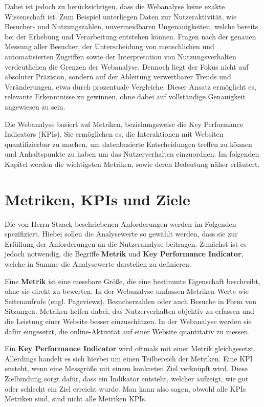 Dabei ist jedoch zu berücksichtigen, dass die Webanalyse keine exakte Wissenschaft ist. Zum Beispiel unterliegen Daten zur Nutzeraktivität, wie Besucher- und Nutzungszahlen, unvermeidbaren Ungenauigkeiten, welche bereits bei der Erhebung und Verarbeitung entstehen können. Fragen nach der genauen Messung aller Besucher, der Unterscheidung von menschlichen und automatisierten Zugriffen sowie der Interpretation von Nutzungsverhalten verdeutlichen die Grenzen der Webanalyse. Dennoch liegt der Fokus nicht auf absoluter Präzision, sondern auf der Ableitung verwertbarer Trends und Veränderungen, etwa durch prozentuale Vergleiche. Dieser Ansatz ermöglicht es, relevante Erkenntnisse zu gewinnen, ohne dabei auf vollständige Genauigkeit angewiesen zu sein. \parencite[Kap.1.4]{Hassler2019}

Die Webanalyse basiert auf Metriken, beziehungsweise die Key Performance Indicators (KPIs). Sie ermöglichen es, die Interaktionen mit Websiten quantifizierbar zu machen, um datenbasierte Entscheidungen treffen zu können und Anhaltspunkte zu haben um das Nutzerverhalten einzuordnen. Im folgenden Kapitel werden die wichtigsten Metriken, sowie deren Bedeutung näher erläutert.

\section{Metriken, KPIs und Ziele} %
\label{sec:kpis}
Die von Herrn Staack beschriebenen Anforderungen werden im Folgenden spezifiziert. Hiebei sollen die Analysewerte so gewählt werden, dass sie zur Erfüllung der Anforderungen an die Nutzeranalyse beitragen. Zunächst ist es jedoch notwendig, die Begriffe \textbf{\glqq Metrik\grqq{}} und \textbf{\glqq Key Performance Indicator\grqq{}}, welche in Summe die Analysewerte darstellen zu definieren.

Eine \textbf{Metrik} ist eine messbare Größe, die eine bestimmte Eigenschaft beschreibt, ohne sie direkt zu bewerten. In der Webanalyse umfassen Metriken Werte wie Seitenaufrufe (engl. Pageviews), Besucherzahlen oder auch Besuche in Form von Sitzungen. Metriken helfen dabei, das Nutzerverhalten objektiv zu erfassen und die Leistung einer Website besser einzuschätzen. In der Webanalyse werden sie dafür eingesetzt, die online-Aktivität auf einer Website quantitativ zu messen. \parencite[Kap.5.1]{Hassler2019} \parencite[S.26]{Dykes2014}

Ein \textbf{Key Performance Indicator} wird oftmals mit einer Metrik gleichgesetzt. Allerdings handelt es sich hierbei um einen Teilbereich der Metriken. Eine KPI ensteht, wenn eine Messgröße mit einem konkreten Ziel verknüpft wird. Diese Zielbindung sorgt dafür, dass ein Indikator entsteht, welcher aufzeigt, wie gut oder schlecht ein Ziel erreicht wurde. Man kann also sagen, obwohl alle KPIs Metriken sind, sind nicht alle Metriken KPIs. \parencite[S.9-13]{Lammenett2019} \parencite[S.46]{Dykes2014}

